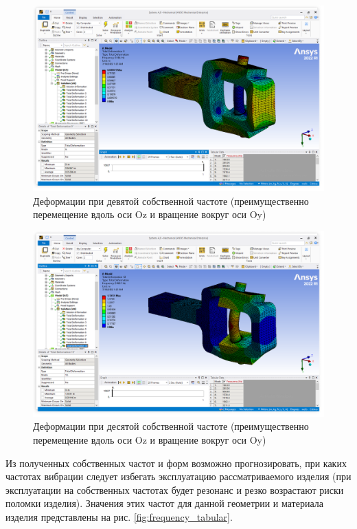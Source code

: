 \begin{figure}[H] 
	\center
	\includegraphics[width=\textwidth]{images/mod9.png}
	\caption{Деформации при девятой собственной частоте (преимущественно перемещение вдоль оси Oz и вращение вокруг оси Oy)}
	\label{fig:mod9}
\end{figure}

\begin{figure}[H] 
	\center
	\includegraphics[width=\textwidth]{images/mod10.png}
	\caption{Деформации при десятой собственной частоте (преимущественно перемещение вдоль оси Oz и вращение вокруг оси Oy)}
	\label{fig:mod10}
\end{figure}


Из полученных собственных частот и форм возможно прогнозировать, при каких частотах вибрации следует избегать эксплуатацию рассматриваемого изделия (при эксплуатации на собственных частотах будет резонанс и резко возрастают риски поломки изделия). Значения этих частот для данной геометрии и материала изделия представлены на рис. \ref{fig:frequency_tabular}.


